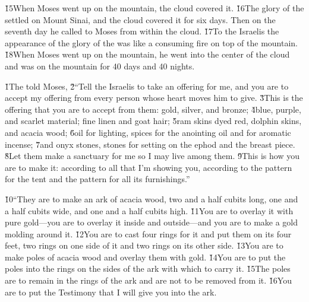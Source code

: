 \v{15}When Moses went up on the mountain, the cloud covered it. \v{16}The glory of the  settled on Mount Sinai, and the cloud covered it for six days. Then on the seventh day he called to Moses from within the cloud. \v{17}To the Israelis the appearance of the glory of the  was like a consuming fire on top of the mountain. \v{18}When Moses went up on the mountain, he went into the center of the cloud and was on the mountain for 40 days and 40 nights.

\v{1}The  told Moses, \v{2}``Tell the Israelis to take an offering for me, and you are to accept my offering from every person whose heart moves him to give. \v{3}This is the offering that you are to accept from them: gold, silver, and bronze; \v{4}blue, purple, and scarlet material; fine linen and goat hair; \v{5}ram skins dyed red, dolphin skins, and acacia wood; \v{6}oil for lighting, spices for the anointing oil and for aromatic incense; \v{7}and onyx stones, stones for setting on the ephod and the breast piece. \v{8}Let them make a sanctuary for me so I may live among them. \v{9}This is how you are to make it: according to all that I'm showing you, according to the pattern for the tent and the pattern for all its furnishings.''

\v{10}``They are to make an ark of acacia wood, two and a half cubits long, one and a half cubits wide, and one and a half cubits high. \v{11}You are to overlay it with pure gold---you are to overlay it inside and outside---and you are to make a gold molding around it. \v{12}You are to cast four rings for it and put them on its four feet, two rings on one side of it and two rings on its other side. \v{13}You are to make poles of acacia wood and overlay them with gold. \v{14}You are to put the poles into the rings on the sides of the ark with which to carry it. \v{15}The poles are to remain in the rings of the ark and are not to be removed from it. \v{16}You are to put the Testimony that I will give you into the ark.

